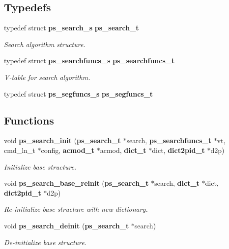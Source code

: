 \subsection*{Typedefs}
\begin{DoxyCompactItemize}
\item 
typedef struct {\bf ps\+\_\+search\+\_\+s} {\bf ps\+\_\+search\+\_\+t}\label{pocketsphinx__internal_8h_adc3de4d62e46c5e6cb93d09fb61be8ee}

\begin{DoxyCompactList}\small\item\em Search algorithm structure. \end{DoxyCompactList}\item 
typedef struct {\bf ps\+\_\+searchfuncs\+\_\+s} {\bf ps\+\_\+searchfuncs\+\_\+t}\label{pocketsphinx__internal_8h_a0eae078e32bd5f339792884c68aad8b3}

\begin{DoxyCompactList}\small\item\em V-\/table for search algorithm. \end{DoxyCompactList}\item 
typedef struct {\bf ps\+\_\+segfuncs\+\_\+s} {\bfseries ps\+\_\+segfuncs\+\_\+t}\label{pocketsphinx__internal_8h_a08187b85c6bc5b4991632dc78e237977}

\end{DoxyCompactItemize}
\subsection*{Functions}
\begin{DoxyCompactItemize}
\item 
void {\bf ps\+\_\+search\+\_\+init} ({\bf ps\+\_\+search\+\_\+t} $\ast$search, {\bf ps\+\_\+searchfuncs\+\_\+t} $\ast$vt, cmd\+\_\+ln\+\_\+t $\ast$config, {\bf acmod\+\_\+t} $\ast$acmod, {\bf dict\+\_\+t} $\ast$dict, {\bf dict2pid\+\_\+t} $\ast$d2p)\label{pocketsphinx__internal_8h_ad848d8d0cf0398542bfb74a2e34dbff3}

\begin{DoxyCompactList}\small\item\em Initialize base structure. \end{DoxyCompactList}\item 
void {\bf ps\+\_\+search\+\_\+base\+\_\+reinit} ({\bf ps\+\_\+search\+\_\+t} $\ast$search, {\bf dict\+\_\+t} $\ast$dict, {\bf dict2pid\+\_\+t} $\ast$d2p)\label{pocketsphinx__internal_8h_a307801961f27bd5f4b82a3e6b83e0ca1}

\begin{DoxyCompactList}\small\item\em Re-\/initialize base structure with new dictionary. \end{DoxyCompactList}\item 
void {\bf ps\+\_\+search\+\_\+deinit} ({\bf ps\+\_\+search\+\_\+t} $\ast$search)\label{pocketsphinx__internal_8h_a1299496b3498166928702d0701934e50}

\begin{DoxyCompactList}\small\item\em De-\/initialize base structure. \end{DoxyCompactList}\end{DoxyCompactItemize}


